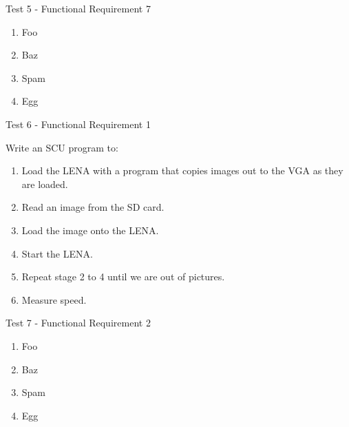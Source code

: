 {\sc Test 5 - Functional Requirement 7}

{\em \FRVII}

\begin{enumerate}
\item Foo
\item Baz
\item Spam
\item Egg
\end{enumerate}

{\sc Test 6 - Functional Requirement 1}

{\em \FRI}

Write an \ac{SCU} program to:
\begin{enumerate}
\item Load the \ac{LENA} with a program that copies images out to the \ac{VGA}
  as they are loaded.
\item Read an image from the \ac{SD} card.
\item Load the image onto the \ac{LENA}.
\item Start the \ac{LENA}.
\item Repeat stage 2 to 4 until we are out of pictures.
\item Measure speed.
\end{enumerate}

{\sc Test 7 - Functional Requirement 2}

{\em \FRII}

\begin{enumerate}
\item Foo
\item Baz
\item Spam
\item Egg
\end{enumerate}
